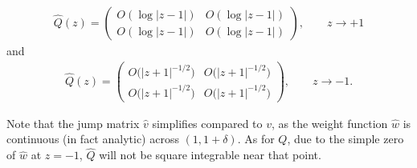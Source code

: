 \documentclass[11pt]{article}
\numberwithin{equation}{section}
\newcommand{\hw}{\widehat w}
\newcommand{\hQ}{{\widehat Q}}
\newcommand{\bv}{v}
\newcommand{\hv}{{\widehat v}}
\numberwithin{equation}{section}
\begin{document}
\begin{enumerate}[(i)]
\begin{align*}
 \hQ(z) = \begin{pmatrix}
 O(\log|z-1|) & O(\log|z-1|)
 \\
 O(\log|z-1|) & O(\log|z-1|)
 \end{pmatrix}, \qquad z\to +1
\end{align*}
and
\begin{align*}
 \hQ(z) = \begin{pmatrix}
 O\big(|z+1|^{-1/2}\big) & O\big(|z+1|^{-1/2}\big)
 \\
 O\big(|z+1|^{-1/2}\big) & O\big(|z+1|^{-1/2}\big)
 \end{pmatrix}, \qquad z \to -1.
\end{align*}
\end{enumerate}

Note that the jump matrix $\hv$ simplifies compared to $\bv$, as the weight function $\hw$ is continuous (in fact analytic) across $(1, 1+\delta)$. As for $Q$, due to the simple zero of $\hw$ at $z = -1$, $\hQ$ will not be square integrable near that point.
\end{document}
